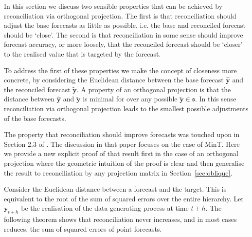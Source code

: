 \documentclass[12pt]{article}
\theoremstyle{definition}
\theoremstyle{property}
\begin{document}
	In this section we discuss two sensible properties that can be achieved by reconciliation via orthogonal projection.  The  first is that reconciliation should adjust the base forecasts as little as possible, i.e. the base and reconciled forecast should be `close'.  The second is that reconciliation in some sense should improve forecast accuracy, or more loosely, that the reconciled forecast should be `closer' to the realised value that is targeted by the forecast.  
	
	To address the first of these properties we make the concept of closeness more concrete, by considering the Euclidean distance between the base forecast $\hat{\bm{y}}$ and the reconciled forecast  $\tilde{\bm{y}}$.  A property of an orthogonal projection is that the distance between $\hat{\bm{y}}$ and $\tilde{\bm{y}}$ is minimal for over any possible $\tilde{\bm{y}}\in\mathfrak{s}$.  In this sense reconciliation via orthogonal projection leads to the smallest possible adjustments of the base forecasts.
	
	The property that reconciliation should improve forecasts was touched upon in Section 2.3 of \cite{WicEtAl2019}.  The discussion in that paper focuses on the case of MinT. Here we provide a new explicit proof of that result first in the case of an orthogonal projection where the geometric intuition of the proof is clear and then generalise the result to reconciliation by any projection matrix in Section~\ref{sec:oblique}.
		
	Consider the Euclidean distance between a forecast and the target. This is equivalent to the root of the sum of squared errors over the entire hierarchy. Let $\bm{y}_{t+h}$ be the realisation of the data generating process at time $t+h$. The following theorem shows that reconciliation never increases, and in most cases reduces, the sum of squared errors of point forecasts.
	
\end{document}
